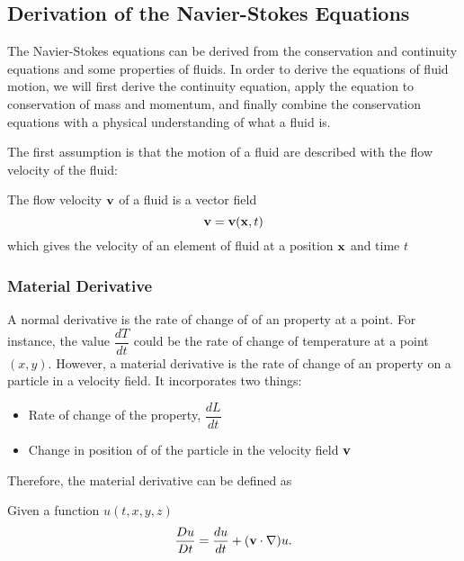 




\subsection{Derivation of the Navier-Stokes Equations}

The Navier-Stokes equations can be derived from the conservation and continuity equations and some  properties of fluids. In order to derive the equations of fluid motion, we  will first derive the continuity equation, apply the equation to conservation of mass and momentum, and finally combine the conservation equations with a physical understanding of what a fluid is.

The first assumption is that the motion of a fluid are described with the flow velocity of the fluid:

\begin{df}
 The flow velocity $\mathbf{ v}$ of a fluid is a vector field
\[ \mathbf{ v} =\mathbf{ v} (\mathbf{ x} ,t)\]
which gives the velocity of an element of fluid at a position $\mathbf{ x}$ and time $t$ 
\end{df}

\subsubsection*{Material Derivative}



 A normal derivative is the rate of change of of an  property at a point. For instance, the value $\dfrac{dT}{dt}$ could be the rate of change of temperature at a point $(x,y)$. However, a material derivative is the rate of change of an  property on a particle in a velocity field. It incorporates  two things:
\begin{itemize}
    \item Rate of change of the property, $\dfrac{dL}{dt}$
    \item Change in position of of the particle in the velocity field $\mathbf{ v}$
\end{itemize}


Therefore, the material derivative can be defined as

\begin{df} Given a function $u(t,x,y,z)$ 
 \[\dfrac{Du}{Dt} = \dfrac{du}{dt} + (\mathbf{ v} \cdot \nabla)u.\]
\end{df}
 



